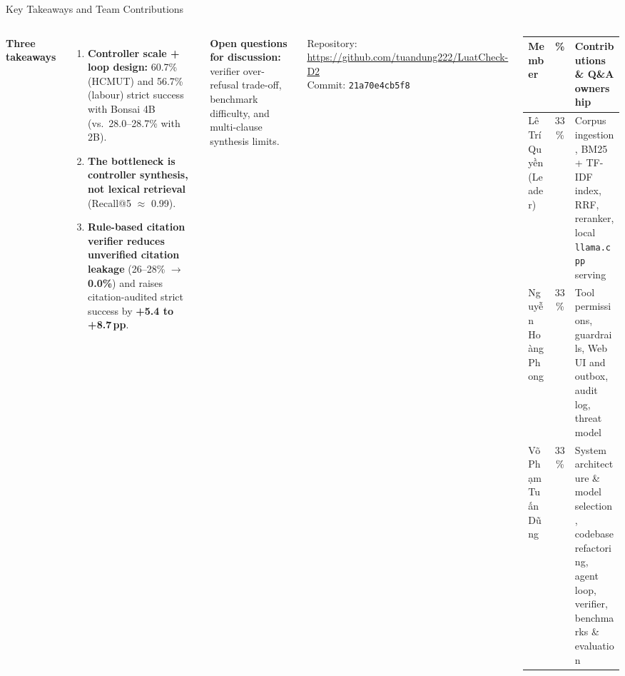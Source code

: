 \documentclass[aspectratio=1610,11pt]{beamer}
\newcommand{\pp}{\,pp\xspace}
\renewcommand{\arraystretch}{1.15}
\begin{document}
\begin{frame}{Key Takeaways and Team Contributions}
  \begin{columns}[T]
    \footnotesize
    \textbf{Three takeaways}
    \begin{enumerate}
      \item \textbf{Controller scale + loop design:} 60.7\% (HCMUT) and 56.7\% (labour) strict success with Bonsai 4B (vs.\ 28.0--28.7\% with 2B).
      \item \textbf{The bottleneck is controller synthesis, not lexical retrieval} (Recall@5 $\approx$ 0.99).
      \item \textbf{Rule-based citation verifier reduces unverified citation leakage} (26--28\% $\to$ \textbf{0.0\%}) and raises citation-audited strict success by \textbf{+5.4 to +8.7\pp}.
    \end{enumerate}
    \textbf{Open questions for discussion:} verifier over-refusal trade-off, benchmark difficulty, and multi-clause synthesis limits.
    \vspace{4pt}

    {\scriptsize Repository: \url{https://github.com/tuandung222/LuatCheck-D2}\\
    Commit: \texttt{21a70e4cb5f8}}

    \scriptsize\renewcommand{\arraystretch}{1.2}
    \begin{tabularx}{\linewidth}{@{}>{\raggedright\arraybackslash}p{2.25cm}c>{\raggedright\arraybackslash}X@{}}
      \toprule Member & \% & Contributions \& Q\&A ownership\\\midrule
      Lê Trí Quyền (Leader) & 33\% & Corpus ingestion, BM25 + TF-IDF index, RRF, reranker, local \texttt{llama.cpp} serving\\
      Nguyễn Hoàng Phong & 33\% & Tool permissions, guardrails, Web UI and outbox, audit log, threat model\\
      Võ Phạm Tuấn Dũng & 33\% & System architecture \& model selection, codebase refactoring, agent loop, verifier, benchmarks \& evaluation\\
      \bottomrule
    \end{tabularx}
  \end{columns}
\end{frame}
\end{document}
